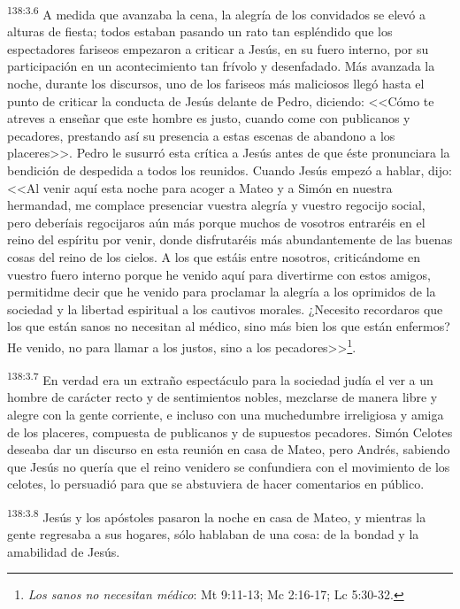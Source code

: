 \par 
\textsuperscript{138:3.6} A medida que avanzaba la cena, la alegría de los convidados se elevó a alturas de fiesta; todos estaban pasando un rato tan espléndido que los espectadores fariseos empezaron a criticar a Jesús, en su fuero interno, por su participación en un acontecimiento tan frívolo y desenfadado. Más avanzada la noche, durante los discursos, uno de los fariseos más maliciosos llegó hasta el punto de criticar la conducta de Jesús delante de Pedro, diciendo: <<Cómo te atreves a enseñar que este hombre es justo, cuando come con publicanos y pecadores, prestando así su presencia a estas escenas de abandono a los placeres>>. Pedro le susurró esta crítica a Jesús antes de que éste pronunciara la bendición de despedida a todos los reunidos. Cuando Jesús empezó a hablar, dijo: <<Al venir aquí esta noche para acoger a Mateo y a Simón en nuestra hermandad, me complace presenciar vuestra alegría y vuestro regocijo social, pero deberíais regocijaros aún más porque muchos de vosotros entraréis en el reino del espíritu por venir, donde disfrutaréis más abundantemente de las buenas cosas del reino de los cielos. A los que estáis entre nosotros, criticándome en vuestro fuero interno porque he venido aquí para divertirme con estos amigos, permitidme decir que he venido para proclamar la alegría a los oprimidos de la sociedad y la libertad espiritual a los cautivos morales. ¿Necesito recordaros que los que están sanos no necesitan al médico, sino más bien los que están enfermos? He venido, no para llamar a los justos, sino a los pecadores>>\footnote{\textit{Los sanos no necesitan médico}: Mt 9:11-13; Mc 2:16-17; Lc 5:30-32.}.

\par 
\textsuperscript{138:3.7} En verdad era un extraño espectáculo para la sociedad judía el ver a un hombre de carácter recto y de sentimientos nobles, mezclarse de manera libre y alegre con la gente corriente, e incluso con una muchedumbre irreligiosa y amiga de los placeres, compuesta de publicanos y de supuestos pecadores. Simón Celotes deseaba dar un discurso en esta reunión en casa de Mateo, pero Andrés, sabiendo que Jesús no quería que el reino venidero se confundiera con el movimiento de los celotes, lo persuadió para que se abstuviera de hacer comentarios en público.

\par 
\textsuperscript{138:3.8} Jesús y los apóstoles pasaron la noche en casa de Mateo, y mientras la gente regresaba a sus hogares, sólo hablaban de una cosa: de la bondad y la amabilidad de Jesús.

